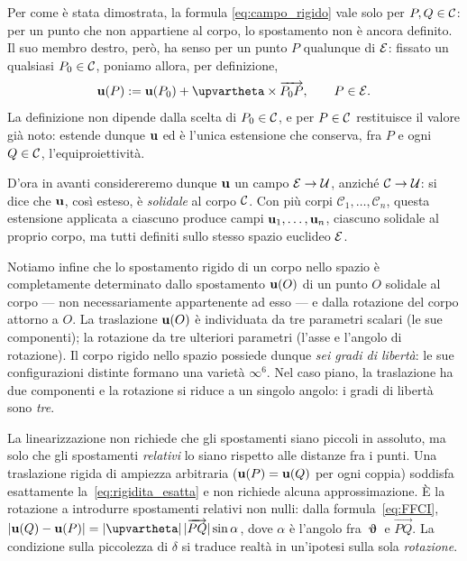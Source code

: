 %
\begin{oss}\label{spaziosolidale}
	Per come è stata dimostrata, la formula \eqref{eq:campo_rigido} vale
	solo per $P,Q\in\mathcal{C}$: per un punto che non appartiene al corpo, lo
	spostamento non è ancora definito. Il suo membro destro, però, ha
	senso per un punto $P$ qualunque di $\mathcal{E}$: fissato un qualsiasi
	$P_0\in\mathcal{C}$, poniamo allora, per definizione,
	\begin{equation}
		\ub(P) := \ub(P_0) + \bm{\upvartheta}\times\overrightarrow{P_0P},
		\qquad P\in\Ec.
	\end{equation}
	La definizione non dipende dalla scelta di $P_0\in\mathcal{C}$, e per $P\in\mathcal{C}$
	restituisce il valore già noto: estende dunque $\mathbf{u}$ ed è
	 l'unica estensione che conserva, fra $P$ e ogni $Q\in\mathcal{C}$,
	l'equiproiettività.
	
	D'ora in avanti considereremo dunque $\mathbf{u}$ un campo $\mathcal{E}\to\mathcal{U}$,
	anziché $\mathcal{C}\to\mathcal{U}$: si dice che $\mathbf{u}$, così esteso, è
	\textit{solidale} al corpo $\mathcal{C}$. Con più corpi
	$\mathcal{C}_1,\dots,\mathcal{C}_n$, questa estensione applicata a
	ciascuno produce campi $\mathbf{u}_1,\dots,\mathbf{u}_n$, ciascuno solidale al
	proprio corpo, ma tutti definiti sullo stesso spazio euclideo $\mathcal{E}$.
\end{oss}

\medskip

Notiamo infine che lo  spostamento rigido di un corpo nello spazio è completamente	determinato dallo spostamento $\mathbf{u}(O)$ di un punto $O$ solidale	al corpo --- non necessariamente appartenente ad esso --- e dalla	rotazione del corpo attorno a $O$. La traslazione $\mathbf{u}(O)$ è	individuata da tre parametri scalari (le sue componenti); la rotazione da tre ulteriori parametri (l'asse e l'angolo di
rotazione). Il corpo rigido nello spazio possiede dunque	\textit{sei gradi di libertà}: le sue configurazioni distinte
formano una varietà $\infty^6$. Nel caso piano, la traslazione	ha due componenti e la rotazione si riduce a un singolo angolo:
i gradi di libertà sono \textit{tre}.	





\begin{oss}
	La linearizzazione non richiede che gli spostamenti siano	piccoli in assoluto, ma solo che gli spostamenti
	\textit{relativi} lo siano rispetto alle distanze fra i	punti. Una traslazione rigida di ampiezza arbitraria
	($\mathbf{u}(P) = \mathbf{u}(Q)$ per ogni coppia) soddisfa esattamente	la~\eqref{eq:rigidita_esatta} e non richiede alcuna
	approssimazione. È la rotazione a introdurre spostamenti	relativi non nulli: dalla formula~\eqref{eq:FFCI},
	$|\ub(Q)-\ub(P)| =	|\bm{\upvartheta}|\,|\overrightarrow{PQ}|\sin\alpha$,	dove $\alpha$ è l'angolo fra $\bm{\upvartheta}$ e
	$\overrightarrow{PQ}$. La condizione	sulla piccolezza di $\delta$ si traduce  realtà in un'ipotesi sulla sola	\textit{rotazione}.
\end{oss}

